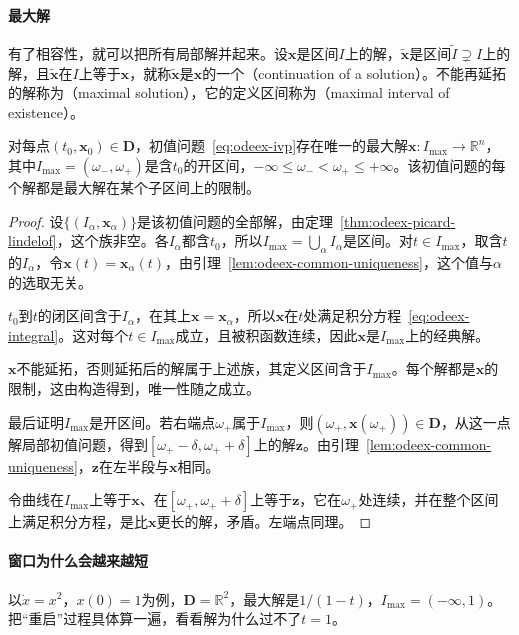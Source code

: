 \paragraph{最大解}
有了相容性，就可以把所有局部解并起来。设$\bm{x}$是区间$I$上的解，$\tilde{\bm{x}}$是区间$\tilde I\supsetneq I$上的解，且$\tilde{\bm{x}}$在$I$上等于$\bm{x}$，就称$\tilde{\bm{x}}$是$\bm{x}$的一个（continuation of a solution）。不能再延拓的解称为（maximal solution），它的定义区间称为（maximal interval of existence）。

\begin{theorem}[最大解]
\label{thm:odeex-maximal}
对每点$(t_0,\bm{x}_0)\in\bm{D}$，初值问题~\eqref{eq:odeex-ivp}存在唯一的最大解$\bm{x}:I_{\max}\to\mathbb{R}^{n}$，其中$I_{\max}=(\omega_-,\omega_+)$是含$t_0$的开区间，$-\infty\leq\omega_-<\omega_+\leq+\infty$。该初值问题的每个解都是最大解在某个子区间上的限制。
\end{theorem}

\begin{proof}
设$\{(I_\alpha,\bm{x}_\alpha)\}$是该初值问题的全部解，由定理~\ref{thm:odeex-picard-lindelof}，这个族非空。各$I_\alpha$都含$t_0$，所以$I_{\max}=\bigcup_\alpha I_\alpha$是区间。对$t\in I_{\max}$，取含$t$的$I_\alpha$，令$\bm{x}(t)=\bm{x}_\alpha(t)$，由引理~\ref{lem:odeex-common-uniqueness}，这个值与$\alpha$的选取无关。

$t_0$到$t$的闭区间含于$I_\alpha$，在其上$\bm{x}=\bm{x}_\alpha$，所以$\bm{x}$在$t$处满足积分方程~\eqref{eq:odeex-integral}。这对每个$t\in I_{\max}$成立，且被积函数连续，因此$\bm{x}$是$I_{\max}$上的经典解。

$\bm{x}$不能延拓，否则延拓后的解属于上述族，其定义区间含于$I_{\max}$。每个解都是$\bm{x}$的限制，这由构造得到，唯一性随之成立。

最后证明$I_{\max}$是开区间。若右端点$\omega_+$属于$I_{\max}$，则$(\omega_+,\bm{x}(\omega_+))\in\bm{D}$，从这一点解局部初值问题，得到$[\omega_+-\delta,\omega_++\delta]$上的解$\bm{z}$。由引理~\ref{lem:odeex-common-uniqueness}，$\bm{z}$在左半段与$\bm{x}$相同。

令曲线在$I_{\max}$上等于$\bm{x}$、在$[\omega_+,\omega_++\delta]$上等于$\bm{z}$，它在$\omega_+$处连续，并在整个区间上满足积分方程，是比$\bm{x}$更长的解，矛盾。左端点同理。
\end{proof}

\paragraph{窗口为什么会越来越短}
以$\dot x=x^2$，$x(0)=1$为例，$\bm{D}=\mathbb{R}^{2}$，最大解是$1/(1-t)$，$I_{\max}=(-\infty,1)$。把“重启”过程具体算一遍，看看解为什么过不了$t=1$。

